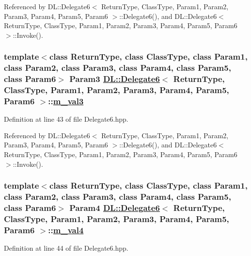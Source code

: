 Referenced by DL::Delegate6$<$ Return\-Type, Class\-Type, Param1, Param2, Param3, Param4, Param5, Param6 $>$::Delegate6(), and DL::Delegate6$<$ Return\-Type, Class\-Type, Param1, Param2, Param3, Param4, Param5, Param6 $>$::Invoke().\hypertarget{classDL_1_1Delegate6_r4}{
\subsubsection[m\_\-val3]{\setlength{\rightskip}{0pt plus 5cm}template$<$class Return\-Type, class Class\-Type, class Param1, class Param2, class Param3, class Param4, class Param5, class Param6$>$ Param3 \hyperlink{classDL_1_1Delegate6}{DL::Delegate6}$<$ Return\-Type, Class\-Type, Param1, Param2, Param3, Param4, Param5, Param6 $>$::\hyperlink{classDL_1_1Delegate6_r4}{m\_\-val3}}}
\label{classDL_1_1Delegate6_r4}




Definition at line 43 of file Delegate6.hpp.

Referenced by DL::Delegate6$<$ Return\-Type, Class\-Type, Param1, Param2, Param3, Param4, Param5, Param6 $>$::Delegate6(), and DL::Delegate6$<$ Return\-Type, Class\-Type, Param1, Param2, Param3, Param4, Param5, Param6 $>$::Invoke().\hypertarget{classDL_1_1Delegate6_r5}{
\subsubsection[m\_\-val4]{\setlength{\rightskip}{0pt plus 5cm}template$<$class Return\-Type, class Class\-Type, class Param1, class Param2, class Param3, class Param4, class Param5, class Param6$>$ Param4 \hyperlink{classDL_1_1Delegate6}{DL::Delegate6}$<$ Return\-Type, Class\-Type, Param1, Param2, Param3, Param4, Param5, Param6 $>$::\hyperlink{classDL_1_1Delegate6_r5}{m\_\-val4}}}
\label{classDL_1_1Delegate6_r5}




Definition at line 44 of file Delegate6.hpp.

